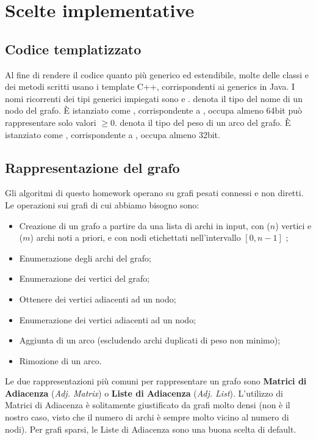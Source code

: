 \section{Scelte implementative}
\label{cap:implementation-choices}

\subsection{Codice templatizzato}

Al fine di rendere il codice quanto più generico ed estendibile, molte delle classi e dei metodi scritti
usano i template C++, corrispondenti ai generics in Java.
I nomi ricorrenti dei tipi generici impiegati sono  e .
 denota il tipo del nome di un nodo del grafo. È istanziato come , corrispondente a , occupa almeno 64bit può rappresentare solo valori $\geq 0$.
 denota il tipo del peso di un arco del grafo. È istanziato come , corrispondente a ,
occupa almeno 32bit.

\subsection{Rappresentazione del grafo}
\label{sub:graph-representation}

Gli algoritmi di questo homework operano su grafi pesati connessi e non diretti.
Le operazioni sui grafi di cui abbiamo bisogno sono:

\begin{itemize}
    \item Creazione di un grafo a partire da una lista di archi in input, con ($n$) vertici e ($m$) archi noti a priori, e con nodi etichettati nell'intervallo $ [0, n-1] $ ;
    \item Enumerazione degli archi del grafo;
    \item Enumerazione dei vertici del grafo;
    \item Ottenere dei vertici adiacenti ad un nodo;
    \item Enumerazione dei vertici adiacenti ad un nodo;
    \item Aggiunta di un arco (escludendo archi duplicati di peso non minimo);
    \item Rimozione di un arco.
\end{itemize}

\noindent Le due rappresentazioni più comuni per rappresentare un grafo sono \textbf{Matrici di Adiacenza} (\textit{Adj. Matrix}) o \textbf{Liste di Adiacenza} (\textit{Adj. List}). L'utilizzo di Matrici di Adiacenza è solitamente giustificato da grafi molto densi (non è il nostro caso, visto che il numero di archi è sempre molto vicino al numero di nodi). Per grafi sparsi, le Liste di Adiacenza sono una buona scelta di default. \\

